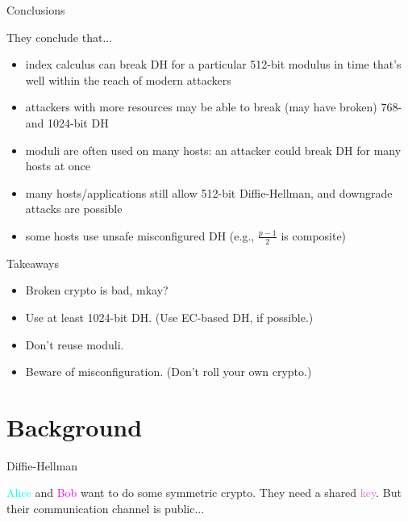 \documentclass[presentation, aspectratio=54]{beamer}
\newcommand{\cyan}[1]{\textcolor{cyan}{#1}}
\newcommand{\magenta}[1]{\textcolor{magenta}{#1}}
\newcommand{\purple}[1]{\textcolor{orchid}{#1}}
\begin{document}
\begin{frame}{Conclusions}

They conclude that...
\begin{itemize}
\item index calculus can break DH for a particular 512-bit modulus in time
      that's well within the reach of modern attackers
\item attackers with more resources may be able to break (may have broken) 768-
      and 1024-bit DH
\item moduli are often used on many hosts: an attacker could break DH for many
      hosts at once
\item many hosts/applications still allow 512-bit Diffie-Hellman, and downgrade
      attacks are possible
\item some hosts use unsafe misconfigured DH (e.g., $\frac{p-1}{2}$ is composite)
\end{itemize}

\end{frame}


\begin{frame}{Takeaways}

\begin{itemize}
\item Broken crypto is bad, mkay?
\item Use at least 1024-bit DH. (Use EC-based DH, if possible.)
\item Don't reuse moduli.
\item Beware of misconfiguration. (Don't roll your own crypto.)
\end{itemize}

\end{frame}


\section{Background}


\begin{frame}{Diffie-Hellman}

\cyan{Alice} and \magenta{Bob} want to do some symmetric crypto. They need a
shared \purple{key}. But their communication channel is public...

\end{frame}
\end{document}
